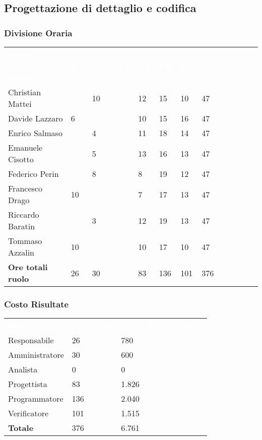 \subsection{Progettazione di dettaglio e codifica}

\subsubsection{Divisione Oraria}
{
	\renewcommand{\arraystretch}{2}
	\centering
	\begin{longtable}{ C{5cm} C{1cm} C{1cm} C{1cm} C{1cm} C{1cm} C{1cm} C{3cm}}
		\textcolor{white}{\textbf{Nome membro del gruppo}} & \textcolor{white}{\textbf{RE}} & \textcolor{white}{\textbf{AM}} & \textcolor{white}{\textbf{AN}} & \textcolor{white}{\textbf{PT}} & \textcolor{white}{\textbf{PR}} & \textcolor{white}{\textbf{VE}} & \textcolor{white}{\textbf{Ore complessive}}\\	
        
        Christian Mattei & & 10 & & 12 & 15 & 10 & 47\\
        Davide Lazzaro & 6 & & & 10 & 15 & 16 & 47\\
        Enrico Salmaso & & 4 & & 11 & 18 & 14 & 47\\
        Emanuele Cisotto & & 5 & & 13 & 16 & 13 & 47 \\
        Federico Perin & & 8 & & 8 & 19 & 12 & 47\\
        Francesco Drago & 10 & & & 7 & 17 & 13 & 47\\
        Riccardo Baratin & & 3 & & 12 & 19 & 13 & 47\\
        Tommaso Azzalin & 10 & & & 10 & 17 & 10 & 47 \\
        \textbf{Ore totali ruolo} & 26 & 30 & & 83 & 136 & 101 & 376\\
		
	\end{longtable}
}

\subsubsection{Costo Risultate}
{
	\renewcommand{\arraystretch}{2}
	\centering
	\begin{longtable}{ C{3cm} C{2cm} C{4cm}}
		\textcolor{white}{\textbf{Ruolo}} & \textcolor{white}{\textbf{Totale ore}} & \textcolor{white}{\textbf{Costo Ruolo in euro}}\\	
        
        Responsabile & 26 & 780 \\
        Amministratore & 30 & 600 \\
        Analista & 0 & 0 \\
        Progettista & 83 & 1.826 \\
        Programmatore & 136 & 2.040 \\
        Verificatore & 101 & 1.515\\
        \textbf{Totale} & 376 & 6.761 \\
		
	\end{longtable}
}

